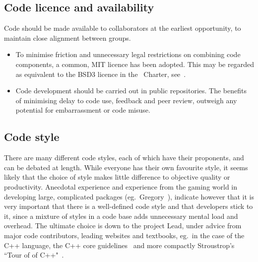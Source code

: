 
\subsection{Code licence and availability} \label{sec:lic}

Code should be made available to collaborators at the earliest opportunity, to maintain
close alignment between groups. 

\begin{itemize}
\item To minimise friction and unnecessary legal restrictions on combining
code components, a common, MIT licence has been adopted. This may be regarded 
as equivalent to the BSD3 licence in the \nep \ Charter, see~.

\item
Code development should be carried out in public
repositories. The benefits of minimising delay to code use, feedback
and peer review, outweigh any potential for embarrassment or code misuse.
\end{itemize}

\subsection{Code style} \label{sec:style}

There are many different code styles, each of which have their
proponents, and can be debated at length.  While everyone has their
own favourite style, it seems likely that the choice of style makes little
difference to objective quality or productivity.  Anecdotal experience
and experience from the gaming world in developing large, complicated packages
(eg.\ Gregory~\cite[\S\,3]{gregory}),
indicate however that it is very important that there is a well-defined
code style and that developers stick to it, since a mixture of
styles in a code base adds unnecessary mental load and overhead.
The ultimate choice is down to the project Lead, under advice from
major code contributors, leading websites and textbooks, eg.\ in the
case of the C++ language, the C++ core guidelines~\cite{cppguidelines}
and more compactly Stroustrop's ``Tour of of C++"~\cite{stroustroptour}.
 
